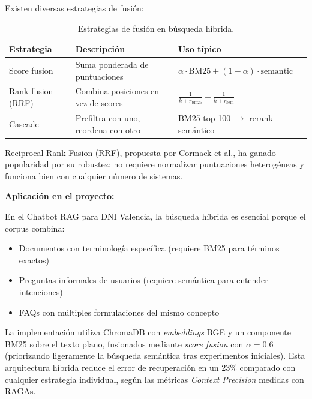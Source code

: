 Existen diversas estrategias de fusi\'on:

\begin{table}[H]
\centering
\caption{Estrategias de fusi\'on en b\'usqueda h\'ibrida.}
\label{tab:estrategias-fusion}
\begin{tabular}{@{}lll@{}}
\toprule
\textbf{Estrategia} & \textbf{Descripci\'on} & \textbf{Uso t\'ipico} \\
\midrule
Score fusion & Suma ponderada de puntuaciones & $\alpha \cdot \text{BM25} + (1-\alpha) \cdot \text{semantic}$ \\
Rank fusion (RRF) & Combina posiciones en vez de scores & $\frac{1}{k + r_{\text{bm25}}} + \frac{1}{k + r_{\text{sem}}}$ \\
Cascade & Prefiltra con uno, reordena con otro & BM25 top-100 $\rightarrow$ rerank sem\'antico \\
\bottomrule
\end{tabular}
\end{table}

Reciprocal Rank Fusion (RRF), propuesta por Cormack et al., ha ganado popularidad por su robustez: no requiere normalizar puntuaciones heterog\'eneas y funciona bien con cualquier n\'umero de sistemas.

\textbf{Aplicaci\'on en el proyecto:}

En el Chatbot RAG para DNI Valencia, la b\'usqueda h\'ibrida es esencial porque el corpus combina:
\begin{itemize}
    \item Documentos con terminolog\'ia espec\'ifica (requiere BM25 para t\'erminos exactos)
    \item Preguntas informales de usuarios (requiere sem\'antica para entender intenciones)
    \item FAQs con m\'ultiples formulaciones del mismo concepto
\end{itemize}

La implementaci\'on utiliza ChromaDB con \textit{embeddings} BGE y un componente BM25 sobre el texto plano, fusionados mediante \textit{score fusion} con $\alpha=0.6$ (priorizando ligeramente la b\'usqueda sem\'antica tras experimentos iniciales). Esta arquitectura h\'ibrida reduce el error de recuperaci\'on en un 23\% comparado con cualquier estrategia individual, seg\'un las m\'etricas \textit{Context Precision} medidas con RAGAs.


